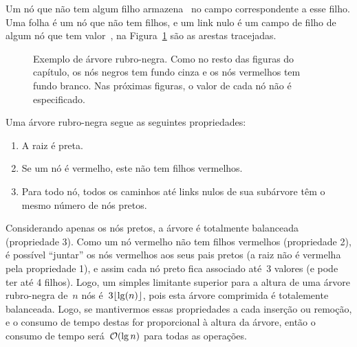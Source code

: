 \documentclass[../../main.tex]{subfiles}
\begin{document}
Um nó que não tem algum filho armazena~ no campo correspondente a esse filho. Uma folha é um nó que não tem filhos, e um link nulo é um campo de filho de algum nó que tem valor~, na Figura~\ref{fig:arv_bin_ex} são as arestas tracejadas.

\begin{figure}
\centering
{}
\caption{Exemplo de árvore rubro-negra. Como no resto das figuras do capítulo, os nós negros tem fundo cinza e os nós vermelhos tem fundo branco. Nas próximas figuras, o valor de cada nó não é especificado.} \label{fig:arv_bin_ex}
\end{figure}

Uma árvore rubro-negra segue as seguintes propriedades:
\begin{enumerate}
\item A raiz é preta.
\item Se um nó é vermelho, este não tem filhos vermelhos.
\item Para todo nó, todos os caminhos até links nulos de sua subárvore têm o mesmo número de nós pretos.
\end{enumerate}

Considerando apenas os nós pretos, a árvore é totalmente balanceada (propriedade 3). Como um nó vermelho não tem filhos vermelhos (propriedade 2), é possível ``juntar'' os nós vermelhos aos seus pais pretos (a raiz não é vermelha pela propriedade 1), e assim cada nó preto fica associado até~3 valores (e pode ter até 4 filhos). Logo, um simples limitante superior para a altura de uma árvore rubro-negra de~$n$ nós é~$3\lfloor\lg(n)\rfloor$, pois esta árvore comprimida é totalemente balanceada. Logo, se mantivermos essas propriedades a cada inserção ou remoção, e o consumo de tempo destas for proporcional à altura da árvore, então o consumo de tempo será~$\mathcal{O}(\lg n)$ para todas as operações.
\end{document}

